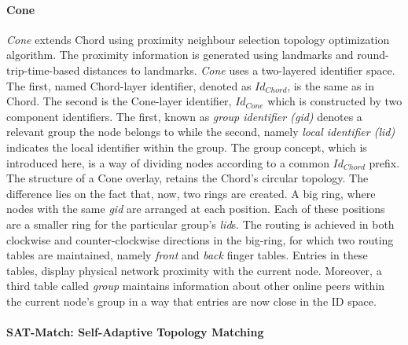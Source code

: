\documentclass[acmcsur,acmnow]{acmtrans2m}
\begin{document}
\paragraph*{\bf Cone}

\textit{Cone}\cite{wang_cone_2007} extends Chord using proximity neighbour selection
topology optimization algorithm. The proximity information is generated using
landmarks and round-trip-time-based distances to landmarks.  \textit{Cone} uses a two-layered
identifier space. The first, named Chord-layer identifier, denoted as
$Id_{Chord}$, is the same as in Chord. The second is the Cone-layer
identifier, $Id_{Cone}$ which is constructed by two component identifiers. The
first, known as \emph{group identifier (gid)} denotes a relevant group the node
belongs to while the second, namely \emph{local identifier (lid)} indicates the
local identifier within the group. The group concept, which is introduced here,
is a way of dividing nodes according to a common $Id_{Chord}$ prefix.  The
structure of a Cone overlay, retains the Chord's circular topology. The difference
lies on the fact that, now, two rings are created. A big ring, where nodes with
the same \emph{gid} are arranged at each position. Each of these positions are a
smaller ring for the particular group's \emph{lid}s. The routing is achieved in
both clockwise and counter-clockwise directions in the big-ring, for which two
routing tables are maintained, namely \emph{front} and \emph{back} finger
tables. Entries in these tables, display physical network
proximity with the current node. Moreover, a third table called \emph{group}
maintains information about other online peers within the current node's
group in a way that entries are now close in the ID space.

\paragraph*{\bf SAT-Match: Self-Adaptive Topology Matching}
\end{document}
